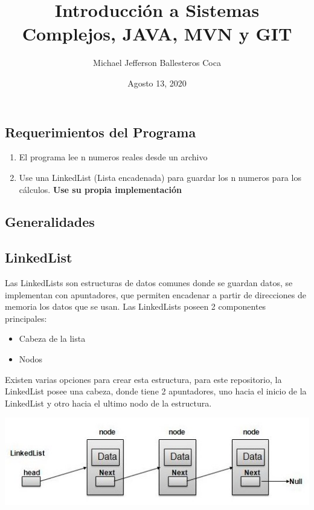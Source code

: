 \documentclass[
	12pt, %
	spanish, %
]{fphw}
\title{Introducción a Sistemas Complejos, JAVA, MVN y GIT} %
\author{Michael Jefferson Ballesteros Coca} %
\date{Agosto 13, 2020} %
\institute{Escuela Colombiana de Ingeniería Julio Garavito \\ Decanatura Ingeniería de Sistemas} %
\begin{document}
\maketitle %



\subsection*{Requerimientos del Programa}

\begin{enumerate}[(a\normalfont)] %
		\item El programa lee n numeros reales desde un archivo
		\item Use una LinkedList (Lista encadenada) para guardar los n numeros para los cálculos. \textbf{Use su propia implementación}
	\end{enumerate}

\subsection*{Generalidades}

\subsection*{LinkedList}

Las LinkedLists son estructuras de datos comunes donde se guardan datos, se implementan con apuntadores, que permiten encadenar a partir de direcciones de memoria los datos que se usan.
Las LinkedLists poseen 2 componentes principales:
\begin{itemize}
	\item Cabeza de la lista
	\item Nodos
\end{itemize}

Existen varias opciones para crear esta estructura, para este repositorio, la LinkedList posee una cabeza, donde tiene 2 apuntadores, uno hacia el inicio de la LinkedList y otro hacia el ultimo nodo de la estructura.

\includegraphics[scale=0.8]{OgP3r.jpg}
\end{document}
